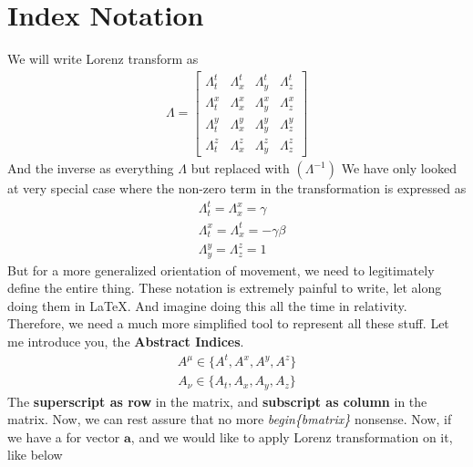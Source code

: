 \documentclass[12pt]{book}
\newcommand{\paren}[1]{\left( #1 \right)}
\newcommand{\etensor}[3]{#1_{#3}^{#2}}
\begin{document}
\section{Index Notation}
We will write Lorenz transform as
\begin{align}
\Lambda = \begin{bmatrix}
    \Lambda^{t}_{t}&\Lambda^{t}_{x}&\Lambda^{t}_{y}&\Lambda^{t}_{z}\\
    \Lambda^{x}_{t}&\Lambda^{x}_{x}&\Lambda^{x}_{y}&\Lambda^{x}_{z}\\
    \Lambda^{y}_{t}&\Lambda^{y}_{x}&\Lambda^{y}_{y}&\Lambda^{y}_z{}\\
    \Lambda^{z}_{t}&\Lambda^{z}_{x}&\Lambda^{z}_{y}&\Lambda^{z}_{z}
\end{bmatrix}
\end{align}
And the inverse as everything $\Lambda$ but replaced with $\paren{\Lambda^{-1}}$ We have only looked at very special case where the non-zero term in the transformation is expressed as
\begin{align}
&\etensor{\Lambda}{t}{t} = \etensor{\Lambda}{x}{x}=\gamma \\
&\etensor{\Lambda}{x}{t} = \etensor{\Lambda}{t}{x}= -\gamma\beta\\
&\etensor{\Lambda}{y}{y} =\etensor{\Lambda}{z}{z} = 1
\end{align}
But for a more generalized orientation of movement, we need to legitimately define the entire thing. These notation is extremely painful to write, let along doing them in \LaTeX. And imagine doing this all the time in relativity. Therefore, we need a much more simplified tool to represent all these stuff. Let me introduce you, the \textbf{Abstract Indices}.
\begin{align}
A^{\mu} \in \{A^{t}, A^{x},A^{y},A^{z}\}
\end{align}
\begin{align}
A_{\nu} \in \{A_{t},A_{x},A_{y},A_{z} \}
\end{align}
The \textbf{superscript as row} in the matrix, and \textbf{subscript as column} in the matrix. Now, we can rest assure that no more \textit{begin\{bmatrix\}} nonsense. 
Now, if we have a for vector $\mathbf{a}$, and we would like to apply Lorenz transformation on it, like below
\end{document}
